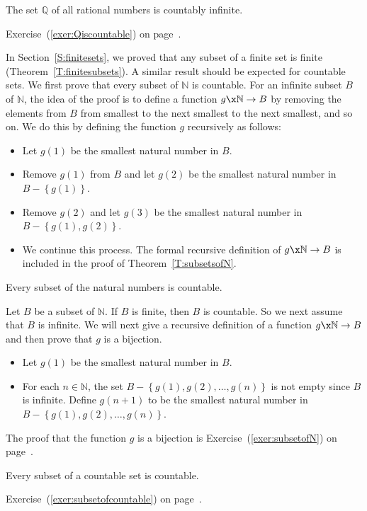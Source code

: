 \begin{theorem}\label{T:Qiscountable}
The set $\mathbb{Q}$ of all rational numbers is countably infinite.
\end{theorem}
%
\begin{myproof}
Exercise~(\ref{exer:Qiscountable}) on page~\pageref{exer:Qiscountable}.
\end{myproof}
%
%
In Section~\ref{S:finitesets}, we proved that any subset of a finite set is finite 
(Theorem~\ref{T:finitesubsets}).  A similar result should be expected for countable sets. We first prove that every subset of $\mathbb{N}$ is countable.  For an infinite subset $B$ of 
$\mathbb{N}$, the idea of the proof is to define a function $g\x  \mathbb{N} \to B$ by removing the elements from $B$ from smallest to the next smallest to the next smallest, and so on.  
We do this by defining the function $g$ recursively as follows:
\begin{itemize}
\item Let $g ( 1 )$ be the smallest natural number in $B$.
\item Remove $g ( 1 )$ from $B$ and let $g ( 2 )$ be the smallest natural number in \linebreak
$B - \left\{ g ( 1 ) \right\}$.
\item Remove $g ( 2 )$ and let $g ( 3 )$ be the smallest natural number in 
\linebreak
$B - \left\{ g ( 1 ), g ( 2 ) \right\}$.
\item We continue this process.  The formal recursive definition of $g\x  \mathbb{N} \to B$ is included in the proof of Theorem~\ref{T:subsetsofN}.
\end{itemize}
%
\begin{theorem}\label{T:subsetsofN}
Every subset of the natural numbers is countable.
\end{theorem}
%
\begin{myproof}
Let $B$ be a subset of $\mathbb{N}$.  If $B$ is finite, then $B$ is countable.  So we next assume that $B$ is infinite.  We will next give a recursive definition of a function 
$g\x  \mathbb{N} \to B$ and then prove that $g$ is a bijection.
\begin{itemize}
\item Let $g ( 1 )$ be the smallest natural number in $B$.
\item For each $n \in \mathbb{N}$, the set 
$B - \left\{ g ( 1 ), g ( 2 ), \ldots, g ( n ) \right\}$ is not empty since $B$ is infinite.  Define $g ( n + 1 )$ to be the smallest natural number in 
\linebreak
$B - \left\{ g ( 1 ), g ( 2 ), \ldots, g ( n ) \right\}$.
\end{itemize}
The proof that the function $g$ is a bijection is Exercise~(\ref{exer:subsetofN}) on page~\pageref{exer:subsetofN}.  
\end{myproof}
%
\begin{corollary}\label{C:subsetofcountable}
Every subset of a countable set is countable.
\end{corollary}
%
\begin{myproof}
Exercise~(\ref{exer:subsetofcountable}) on page~\pageref{exer:subsetofcountable}.
\end{myproof}
%

\hbreak

\endinput
